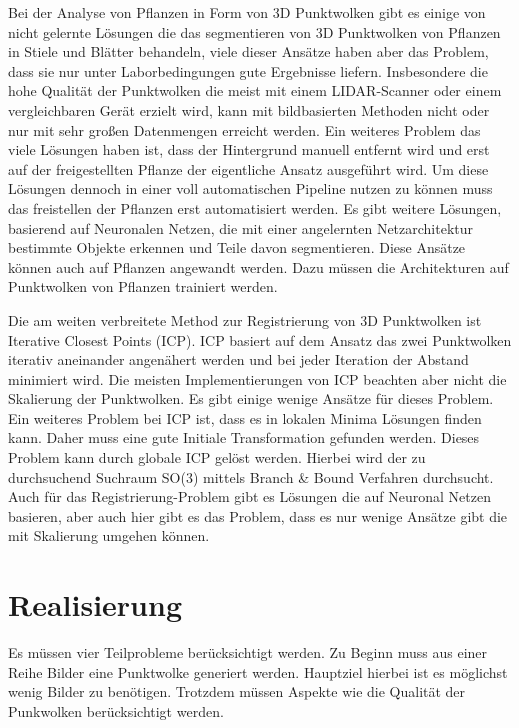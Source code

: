 \documentclass[12pt,titlepage]{article}
\begin{document}
Bei der Analyse von Pflanzen in Form von 3D Punktwolken gibt es einige von nicht gelernte Lösungen die das segmentieren von 3D Punktwolken von Pflanzen in Stiele und Blätter behandeln, viele dieser Ansätze haben aber das Problem, dass sie nur unter Laborbedingungen gute Ergebnisse liefern. 
Insbesondere die hohe Qualität der Punktwolken die meist mit einem LIDAR-Scanner oder einem vergleichbaren Gerät erzielt wird, kann mit bildbasierten Methoden nicht oder nur mit sehr großen Datenmengen erreicht werden. 
Ein weiteres Problem das viele Lösungen haben ist, dass der Hintergrund manuell entfernt wird und erst auf der freigestellten Pflanze der eigentliche Ansatz ausgeführt wird. 
Um diese Lösungen dennoch in einer voll automatischen Pipeline nutzen zu können muss das freistellen der Pflanzen erst automatisiert werden.
Es gibt weitere Lösungen, basierend auf Neuronalen Netzen, die mit einer angelernten Netzarchitektur bestimmte Objekte erkennen und Teile davon segmentieren. Diese Ansätze können auch auf Pflanzen angewandt werden. Dazu müssen die Architekturen auf Punktwolken von Pflanzen trainiert werden.  

Die am weiten verbreitete Method zur Registrierung von 3D Punktwolken ist Iterative Closest Points (ICP). ICP basiert auf dem Ansatz das zwei Punktwolken iterativ aneinander angenähert werden und bei jeder Iteration der Abstand minimiert wird.
Die meisten Implementierungen von ICP beachten aber nicht die Skalierung der Punktwolken. Es gibt einige wenige Ansätze für dieses Problem. 
Ein weiteres Problem bei ICP ist, dass es in lokalen Minima Lösungen finden kann. Daher muss eine gute Initiale Transformation gefunden werden. Dieses Problem kann durch globale ICP gelöst werden. Hierbei wird der zu durchsuchend Suchraum SO(3) mittels Branch \& Bound Verfahren durchsucht.
Auch für das Registrierung-Problem gibt es Lösungen die auf Neuronal Netzen basieren, aber auch hier gibt es das Problem, dass es nur wenige Ansätze gibt die mit Skalierung umgehen können.

\newpage
\section{Realisierung}
\label{sec:realisierung}
Es müssen vier Teilprobleme berücksichtigt werden. Zu Beginn muss aus einer Reihe Bilder eine Punktwolke generiert werden. Hauptziel hierbei ist es möglichst wenig Bilder zu benötigen. 
Trotzdem müssen Aspekte wie die Qualität der Punkwolken berücksichtigt werden. 
\end{document}
